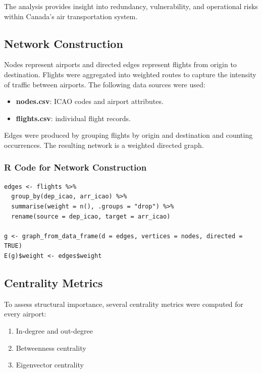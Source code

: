 \documentclass[9pt]{article}
\begin{document}
The analysis provides insight into redundancy, vulnerability, and operational risks within Canada’s air transportation system.

\subsection{Network Construction}

Nodes represent airports and directed edges represent flights from origin to destination. Flights were aggregated into weighted routes to capture the intensity of traffic between airports. The following data sources were used:

\begin{itemize}
    \item \textbf{nodes.csv}: ICAO codes and airport attributes.
    \item \textbf{flights.csv}: individual flight records.
\end{itemize}

Edges were produced by grouping flights by origin and destination and counting occurrences. The resulting network is a weighted directed graph.

\subsubsection{R Code for Network Construction}

\begin{verbatim}
edges <- flights %>%
  group_by(dep_icao, arr_icao) %>%
  summarise(weight = n(), .groups = "drop") %>%
  rename(source = dep_icao, target = arr_icao)

g <- graph_from_data_frame(d = edges, vertices = nodes, directed = TRUE)
E(g)$weight <- edges$weight
\end{verbatim}

\subsection{Centrality Metrics}

To assess structural importance, several centrality metrics were computed for every airport:

\begin{enumerate}[label=\arabic*.]
    \item In-degree and out-degree
    \item Betweenness centrality
    \item Eigenvector centrality
\end{enumerate}
\end{document}
